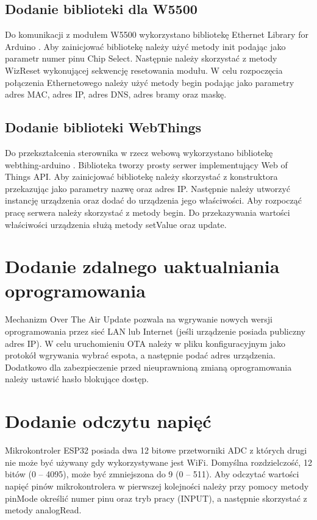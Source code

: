 \documentclass[11pt]{report}
\begin{document}
 \subsection{Dodanie biblioteki dla W5500}
 Do komunikacji z modułem W5500 wykorzystano bibliotekę Ethernet Library for Arduino \cite{ethernetlibrary}. Aby zainicjować bibliotekę należy użyć metody init podając jako parametr numer pinu Chip Select. Następnie należy skorzystać z metody WizReset wykonującej sekwencję resetowania modułu. W celu rozpoczęcia połączenia Ethernetowego należy użyć metody begin podając jako parametry adres MAC, adres IP, adres DNS, adres bramy oraz maskę.
 \subsection{Dodanie biblioteki WebThings}
 Do przekształcenia sterownika w rzecz webową wykorzystano bibliotekę webthing-arduino \cite{webthinglibrary}. Biblioteka tworzy prosty serwer implementujący Web of Things API.
 Aby zainicjować bibliotekę należy skorzystać z konstruktora przekazując jako parametry nazwę oraz adres IP. Następnie należy utworzyć instancję urządzenia oraz dodać do urządzenia jego właściwości. Aby rozpocząć pracę serwera należy skorzystać z metody begin. Do przekazywania wartości właściwości urządzenia służą metody setValue oraz update.
 
 \section{Dodanie zdalnego uaktualniania oprogramowania}
 Mechanizm Over The Air Update pozwala na wgrywanie nowych wersji oprogramowania przez sieć LAN lub Internet (jeśli urządzenie posiada publiczny adres IP). W celu uruchomieniu OTA należy w pliku konfiguracyjnym jako protokół wgrywania wybrać espota, a następnie podać adres urządzenia. Dodatkowo dla zabezpieczenie przed nieuprawnioną zmianą oprogramowania należy ustawić hasło blokujące dostęp.
 
 \section{Dodanie odczytu napięć}
 Mikrokontroler ESP32 posiada dwa 12 bitowe przetworniki ADC z których drugi nie może być używany gdy wykorzystywane jest WiFi. Domyślna rozdzielczość, 12 bitów (0 – 4095), może być zmniejszona do 9 (0 – 511).
 Aby odczytać wartości napięć pinów mikrokontrolera w pierwszej kolejności należy przy pomocy metody pinMode określić numer pinu oraz tryb pracy (INPUT), a następnie skorzystać z metody analogRead.
 
\end{document}
